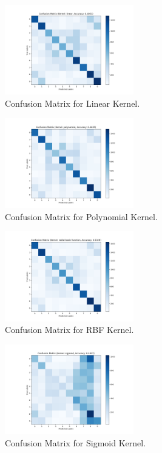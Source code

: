 \documentclass[lettersize,journal]{IEEEtran}
\begin{document}
\begin{figure}[H]
    \centering
    \includegraphics[width=0.5\textwidth]{confusion_matrix_linear.png}
    \caption{Confusion Matrix for Linear Kernel.}
    \label{fig:confusion-matrix-linear}
\end{figure}
\begin{figure}[H]
    \centering
    \includegraphics[width=0.5\textwidth]{confusion_matrix_polynomial.png}
    \caption{Confusion Matrix for Polynomial Kernel.}
    \label{fig:confusion-matrix-polynomial}
\end{figure}
\begin{figure}[H]
    \centering
    \includegraphics[width=0.5\textwidth]{confusion_matrix_radial basis function.png}
    \caption{Confusion Matrix for RBF Kernel.}
    \label{fig:confusion-matrix-RBF}
\end{figure}
\begin{figure}[H]
    \centering
    \includegraphics[width=0.5\textwidth]{confusion_matrix_sigmoid.png}
    \caption{Confusion Matrix for Sigmoid Kernel.}
    \label{fig:confusion-matrix-sigmoid}
\end{figure}
\end{document}
